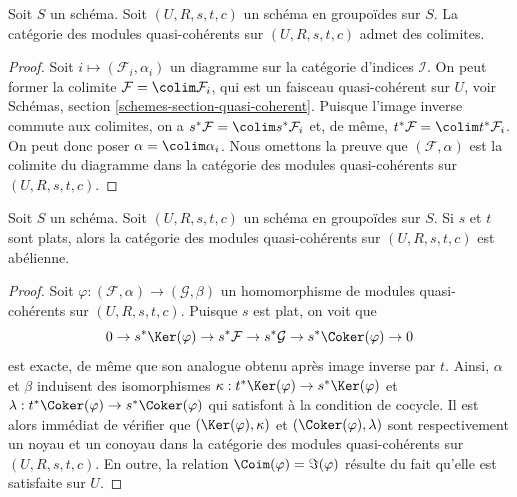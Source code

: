 \begin{lemma}
\label{lemma-colimits}
Soit $S$ un schéma. Soit $(U, R, s, t, c)$ un schéma en groupoïdes sur $S$.
La catégorie des modules quasi-cohérents sur $(U, R, s, t, c)$ admet des colimites.
\end{lemma}

\begin{proof}
Soit $i \mapsto (\mathcal{F}_i, \alpha_i)$ un diagramme sur la catégorie
d'indices $\mathcal{I}$. On peut former la colimite
$\mathcal{F} = \colim \mathcal{F}_i$,
qui est un faisceau quasi-cohérent sur $U$, voir
Schémas, section \ref{schemes-section-quasi-coherent}.
Puisque l'image inverse commute aux colimites, on a
$s^*\mathcal{F} = \colim s^*\mathcal{F}_i$ et, de même,
$t^*\mathcal{F} = \colim t^*\mathcal{F}_i$. On peut donc poser
$\alpha = \colim \alpha_i$. Nous omettons la preuve que $(\mathcal{F}, \alpha)$
est la colimite du diagramme dans la catégorie des modules quasi-cohérents
sur $(U, R, s, t, c)$.
\end{proof}

\begin{lemma}
\label{lemma-abelian}
Soit $S$ un schéma.
Soit $(U, R, s, t, c)$ un schéma en groupoïdes sur $S$.
Si $s$ et $t$ sont plats, alors la catégorie des modules quasi-cohérents sur
$(U, R, s, t, c)$ est abélienne.
\end{lemma}

\begin{proof}
Soit $\varphi : (\mathcal{F}, \alpha) \to (\mathcal{G}, \beta)$ un
homomorphisme de modules quasi-cohérents sur $(U, R, s, t, c)$. Puisque
$s$ est plat, on voit que
$$
0 \to s^*\Ker(\varphi)
\to s^*\mathcal{F} \to s^*\mathcal{G} \to s^*\Coker(\varphi) \to 0
$$
est exacte, de même que son analogue obtenu après image inverse par $t$. Ainsi, $\alpha$ et $\beta$
induisent des isomorphismes
$\kappa : t^*\Ker(\varphi) \to s^*\Ker(\varphi)$ et
$\lambda : t^*\Coker(\varphi) \to s^*\Coker(\varphi)$
qui satisfont à la condition de cocycle. Il est alors immédiat de
vérifier que $(\Ker(\varphi), \kappa)$ et
$(\Coker(\varphi), \lambda)$ sont respectivement un noyau et un conoyau dans la
catégorie des modules quasi-cohérents sur $(U, R, s, t, c)$. En outre,
la relation $\Coim(\varphi) = \Im(\varphi)$ résulte
du fait qu'elle est satisfaite sur $U$.
\end{proof}













